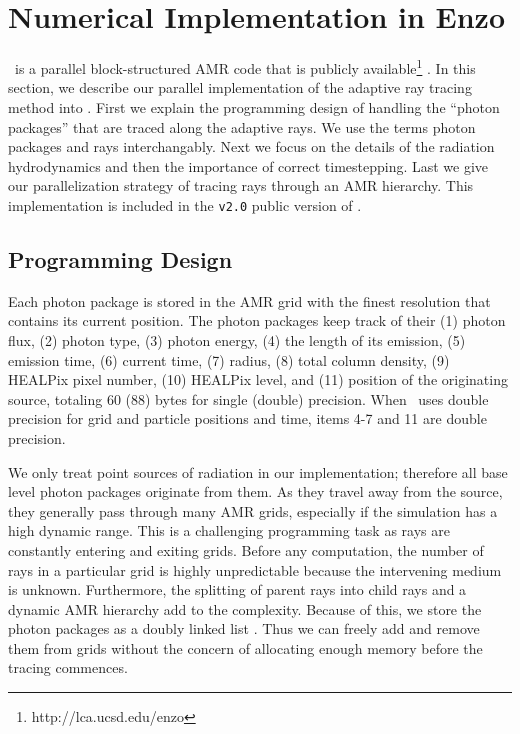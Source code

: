 \documentclass[12pt,preprint]{aastex}
\begin{document}
\section{Numerical Implementation in Enzo}

\enzo~is a parallel block-structured AMR \citep{BergerAMR} code that
is publicly available\footnote{http://lca.ucsd.edu/enzo}
\citep{BryanNorman1997, OShea2004}.  In this section, we describe our
parallel implementation of the adaptive ray tracing method into \enzo.
First we explain the programming design of handling the ``photon
packages'' that are traced along the adaptive rays.  We use the terms
photon packages and rays interchangably.  Next we focus on the details
of the radiation hydrodynamics and then the importance of correct
timestepping.  Last we give our parallelization strategy of tracing
rays through an AMR hierarchy.  This implementation is included in the
\texttt{v2.0} public version of \enzo.

\subsection{Programming Design}
\label{sec:design}

Each photon package is stored in the AMR grid with the finest
resolution that contains its current position.  The photon packages
keep track of their (1) photon flux, (2) photon type, (3) photon
energy, (4) the length of its emission, (5) emission time, (6) current
time, (7) radius, (8) total column density, (9) HEALPix pixel number,
(10) HEALPix level, and (11) position of the originating source,
totaling 60 (88) bytes for single (double) precision.  When \enzo~uses
double precision for grid and particle positions and time, items 4-7
and 11 are double precision.

We only treat point sources of radiation in our implementation;
therefore all base level photon packages originate from them.  As they
travel away from the source, they generally pass through many AMR
grids, especially if the simulation has a high dynamic range.  This is
a challenging programming task as rays are constantly entering and
exiting grids.  Before any computation, the number of rays in a
particular grid is highly unpredictable because the intervening medium
is unknown.  Furthermore, the splitting of parent rays into child rays
and a dynamic AMR hierarchy add to the complexity.  Because of this,
we store the photon packages as a doubly linked list
\citep{Abel02_RT}.  Thus we can freely add and remove them from grids
without the concern of allocating enough memory before the tracing
commences.
\end{document}
